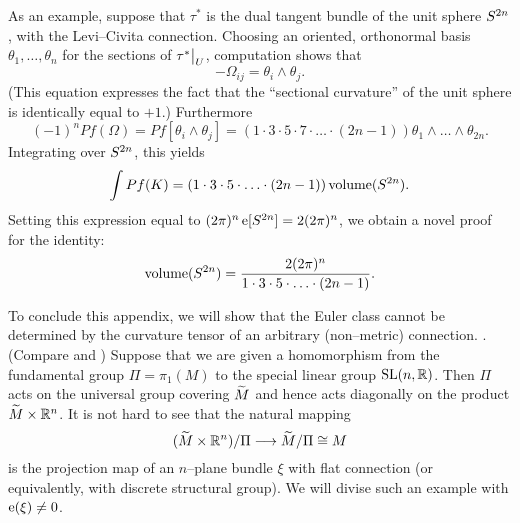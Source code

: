 \documentclass[../main]{subfiles}
\begin{document}
As an example, suppose that $\tau^\ast$ is the dual tangent bundle of the unit sphere $S^{2n}$, with the Levi--Civita connection. Choosing an oriented, orthonormal basis $\theta_1, \ldots, \theta_n$ for the sections of $\tau^\ast \big{|}_U$, computation shows that \[-\Omega_{ij} = \theta_i \wedge \theta_j.\] (This equation expresses the fact that the ``sectional curvature'' of the unit sphere is identically equal to $+1$.) Furthermore \[(-1)^n Pf(\Omega) = Pf[\theta_i \wedge \theta_j] = (1 \cdot 3 \cdot 5 \cdot 7 \cdot \ldots \cdot (2n - 1)) \theta_1 \wedge \ldots \wedge \theta_{2n}.\] Integrating over $S^{2n}$, this yields \[\int Pf(K) = (1 \cdot 3 \cdot 5 \cdot \ldots \cdot (2n - 1)) \operatorname{volume}(S^{2n}).\] Setting this expression equal to $(2 \pi)^n \operatorname{e}[S^{2n}] = 2(2 \pi)^n$, we obtain a novel proof for the identity: \[\operatorname{volume}(S^{2n}) = \dfrac{2(2 \pi)^n}{1 \cdot 3 \cdot 5 \cdot \ldots \cdot (2n - 1)}.\] 

To conclude this appendix, we will show that the Euler class cannot be determined by the curvature tensor of an arbitrary (non--metric) connection. . (Compare \cite{Milnor1958} and \cite{wood}) Suppose that we are given a homomorphism from the fundamental group $\Pi = \pi_1(M)$ to the special linear group $\operatorname{SL}(n, \mathbb R)$. Then $\Pi$ acts on the universal group covering ${\xtilde M}$ and hence acts diagonally on the product ${\xtilde M} \times {\mathbb R}^n$. It is not hard to see that the natural mapping \[({\xtilde M} \times {\mathbb R}^n)/\Pi \longrightarrow {\xtilde M}/\Pi \cong M\] is the projection map of an $n$--plane bundle $\xi$ with flat connection (or equivalently, with discrete structural group). We will divise such an example with $\operatorname{e}(\xi) \ne 0$. 
\end{document}
